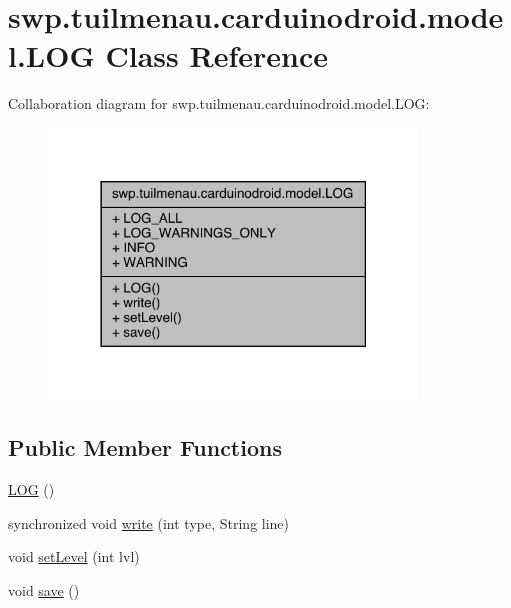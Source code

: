 \hypertarget{classswp_1_1tuilmenau_1_1carduinodroid_1_1model_1_1_l_o_g}{}\section{swp.\+tuilmenau.\+carduinodroid.\+model.\+L\+O\+G Class Reference}
\label{classswp_1_1tuilmenau_1_1carduinodroid_1_1model_1_1_l_o_g}


Collaboration diagram for swp.\+tuilmenau.\+carduinodroid.\+model.\+L\+O\+G\+:
\nopagebreak
\begin{figure}[H]
\begin{center}
\leavevmode
\includegraphics[width=278pt]{classswp_1_1tuilmenau_1_1carduinodroid_1_1model_1_1_l_o_g__coll__graph}
\end{center}
\end{figure}
\subsection*{Public Member Functions}
\begin{DoxyCompactItemize}
\item 
\hyperlink{classswp_1_1tuilmenau_1_1carduinodroid_1_1model_1_1_l_o_g_a56023f651e46d2187d3103b08781c487}{L\+O\+G} ()
\item 
synchronized void \hyperlink{classswp_1_1tuilmenau_1_1carduinodroid_1_1model_1_1_l_o_g_a07a373e26dd4618bab84def0c899635a}{write} (int type, String line)
\item 
void \hyperlink{classswp_1_1tuilmenau_1_1carduinodroid_1_1model_1_1_l_o_g_af5353ab3a1312b1078ca115fa6e96fcf}{set\+Level} (int lvl)
\item 
void \hyperlink{classswp_1_1tuilmenau_1_1carduinodroid_1_1model_1_1_l_o_g_aaff09fa233326c5968dac4aa2bda4442}{save} ()
\end{DoxyCompactItemize}
